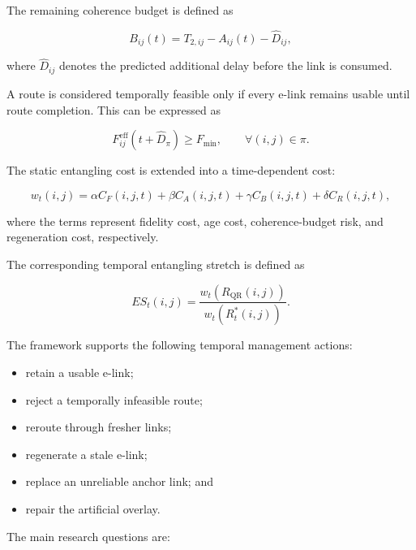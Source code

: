 The remaining coherence budget is defined as

\begin{equation}
    B_{ij}(t)
    =
    T_{2,ij}
    -
    A_{ij}(t)
    -
    \widehat{D}_{ij},
\end{equation}

where $\widehat{D}_{ij}$ denotes the predicted additional delay before the link is consumed.

A route is considered temporally feasible only if every e-link remains usable until route completion. This can be expressed as

\begin{equation}
    F_{ij}^{\mathrm{eff}}
    \left(
    t+\widehat{D}_{\pi}
    \right)
    \geq
    F_{\min},
    \qquad
    \forall (i,j)\in\pi.
\end{equation}

The static entangling cost is extended into a time-dependent cost:

\begin{equation}
    w_t(i,j)
    =
    \alpha C_F(i,j,t)
    +
    \beta C_A(i,j,t)
    +
    \gamma C_B(i,j,t)
    +
    \delta C_R(i,j,t),
\end{equation}

where the terms represent fidelity cost, age cost, coherence-budget risk, and regeneration cost, respectively.

The corresponding temporal entangling stretch is defined as

\begin{equation}
    ES_t(i,j)
    =
    \frac{
    w_t
    \left(
    R_{\mathrm{QR}}(i,j)
    \right)
    }{
    w_t
    \left(
    R_t^{*}(i,j)
    \right)
    }.
\end{equation}

The framework supports the following temporal management actions:

\begin{itemize}
    \item retain a usable e-link;
    \item reject a temporally infeasible route;
    \item reroute through fresher links;
    \item regenerate a stale e-link;
    \item replace an unreliable anchor link; and
    \item repair the artificial overlay.
\end{itemize}

The main research questions are:

